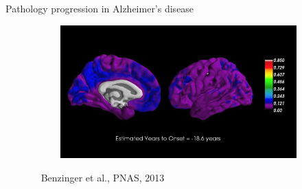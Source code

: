 \documentclass[10pt,xcolor=table,aspectratio=169]{beamer}
\begin{document}
\begin{frame}[t]{Pathology progression in Alzheimer's disease}

\vspace{-2em}
\begin{figure}
\centering
  \centering
  \begin{subfigure}[b]{1\textwidth}
   \centering
   \includegraphics[width=\textwidth,trim=0 30 0 70,clip]{images/dian-pib100.png}
  \end{subfigure}
  ~
Benzinger et al., PNAS, 2013
\end{figure}


\end{frame}
\end{document}
